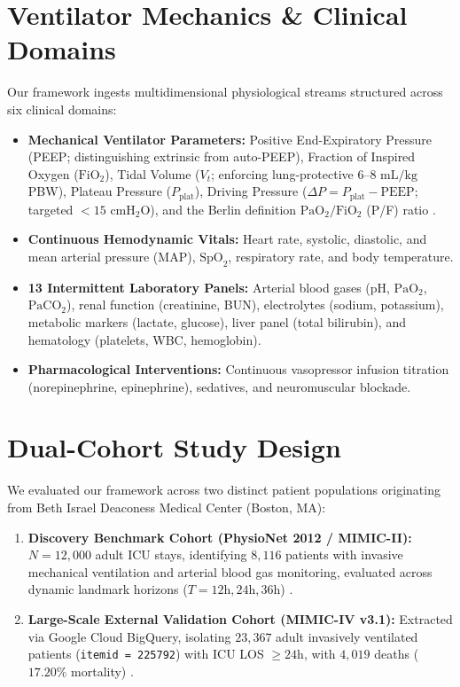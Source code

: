 \documentclass[journal]{IEEEtran}
\begin{document}
\section{Ventilator Mechanics \& Clinical Domains}
Our framework ingests multidimensional physiological streams structured across six clinical domains:
\begin{itemize}
    \item \textbf{Mechanical Ventilator Parameters:} Positive End-Expiratory Pressure (PEEP; distinguishing extrinsic from auto-PEEP), Fraction of Inspired Oxygen ($\text{FiO}_2$), Tidal Volume ($V_t$; enforcing lung-protective $6\text{--}8\text{ mL/kg}$ PBW), Plateau Pressure ($P_{\text{plat}}$), Driving Pressure ($\Delta P = P_{\text{plat}} - \text{PEEP}$; targeted $< 15\text{ cmH}_2\text{O}$), and the Berlin definition $\text{PaO}_2/\text{FiO}_2$ (P/F) ratio \cite{amato2015, ards2012}.
    \item \textbf{Continuous Hemodynamic Vitals:} Heart rate, systolic, diastolic, and mean arterial pressure (MAP), $\text{SpO}_2$, respiratory rate, and body temperature.
    \item \textbf{13 Intermittent Laboratory Panels:} Arterial blood gases (pH, $\text{PaO}_2$, $\text{PaCO}_2$), renal function (creatinine, BUN), electrolytes (sodium, potassium), metabolic markers (lactate, glucose), liver panel (total bilirubin), and hematology (platelets, WBC, hemoglobin).
    \item \textbf{Pharmacological Interventions:} Continuous vasopressor infusion titration (norepinephrine, epinephrine), sedatives, and neuromuscular blockade.
\end{itemize}

\section{Dual-Cohort Study Design}
We evaluated our framework across two distinct patient populations originating from Beth Israel Deaconess Medical Center (Boston, MA):
\begin{enumerate}
    \item \textbf{Discovery Benchmark Cohort (PhysioNet 2012 / MIMIC-II):} $N = 12,000$ adult ICU stays, identifying $8,116$ patients with invasive mechanical ventilation and arterial blood gas monitoring, evaluated across dynamic landmark horizons ($T = 12\text{h}, 24\text{h}, 36\text{h}$) \cite{silva2012}.
    \item \textbf{Large-Scale External Validation Cohort (MIMIC-IV v3.1):} Extracted via Google Cloud BigQuery, isolating $23,367$ adult invasively ventilated patients (\texttt{itemid = 225792}) with ICU LOS $\ge 24\text{h}$, with $4,019$ deaths ($17.20\%$ mortality) \cite{johnson2023}.
\end{enumerate}
\end{document}
